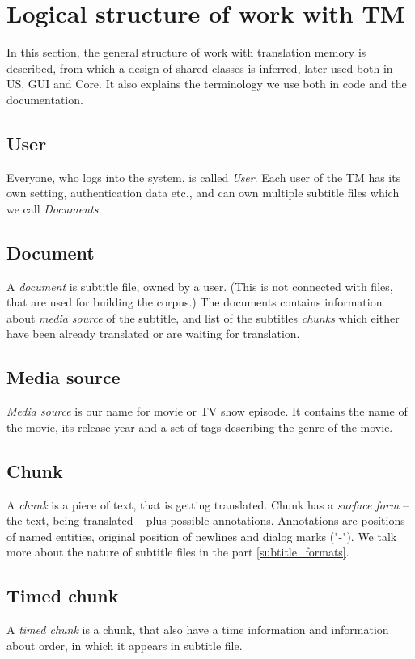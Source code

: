 \section{Logical structure of work with TM}
\label{sec:shared_structure}

In this section, the general structure of work with translation memory is described, from which a design of shared classes is inferred, later used both in US, GUI and Core. It also explains the terminology we use both in code and the documentation.

\subsection*{User}
Everyone, who logs into the system, is called \emph{User}. Each user of the TM has its own setting, authentication data etc., and can own multiple subtitle files which we call \emph{Documents}.

\subsection*{Document}
A \emph{document} is subtitle file, owned by a user. (This is not connected with files, that are used for building the corpus.) The documents contains information about \emph{media source} of the subtitle, and list of the subtitles \emph{chunks} which either have been already translated or are waiting for translation.

\subsection*{Media source}
\emph{Media source} is our name for movie or TV show episode. It contains the name of the movie, its release year and a set of tags describing the genre of the movie.

\subsection*{Chunk}
A \emph{chunk} is a piece of text, that is getting translated. Chunk has a \emph{surface form} -- the text, being translated -- plus possible annotations. Annotations are positions of named entities, original position of newlines and dialog marks ("-"). We talk more about the nature of subtitle files in the part \ref{subtitle_formats}.

\subsection*{Timed chunk}
A \emph{timed chunk} is a chunk, that also have a time information and information about order, in which it appears in subtitle file.

